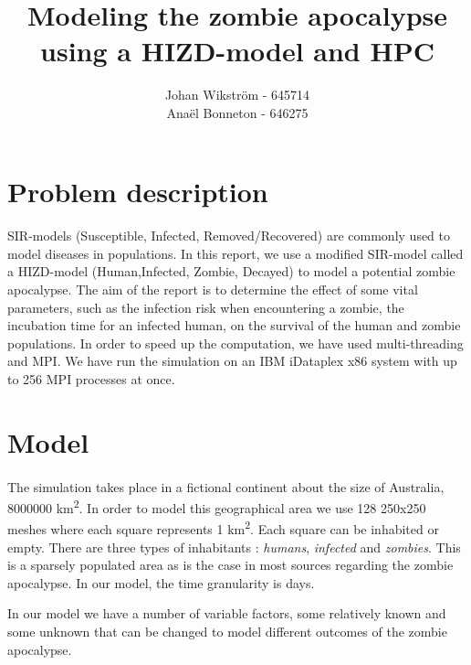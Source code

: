 \documentclass{report}
\begin{document}
\title{Modeling the zombie apocalypse using a HIZD-model and HPC}
\author{Johan Wikström - 645714 \\
        Anaël Bonneton - 646275}
\maketitle
\tableofcontents

\section{Problem description}	

\paragraph{}
SIR-models (Susceptible, Infected, Removed/Recovered) are commonly used to model diseases in populations. In this report, we use a modified SIR-model called a HIZD-model (Human,Infected, Zombie, Decayed) to model a potential zombie apocalypse. The aim of the report is to determine the effect of some vital parameters, such as the infection risk when encountering a zombie, the incubation time for an infected human, on the survival of the human and zombie populations. In order to speed up the computation, we have used multi-threading and MPI\cite{openmpi}. We have run the simulation on an IBM iDataplex x86 system with up to 256 MPI processes at once.

\section{Model}

\paragraph{}
The simulation takes place in a fictional continent about the size of Australia, 8000000 km\textsuperscript{2}. In order to model this geographical area we use 128 250x250 meshes where each square represents 1 km\textsuperscript{2}. Each square can be inhabited or empty. There are three types of inhabitants : \emph{humans}, \emph{infected} and \emph{zombies}. This is a sparsely populated area as is the case in most sources regarding the zombie apocalypse\cite{zombieland}. In our model, the time granularity is days.

In our model we have a number of variable factors, some relatively known and some unknown that can be changed to model different outcomes of the zombie apocalypse.
\end{document}
